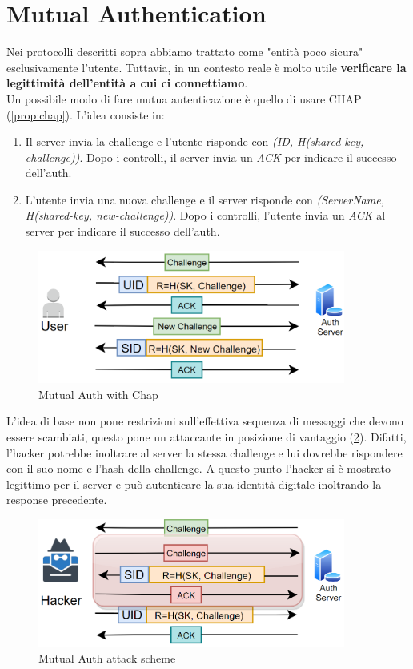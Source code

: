 \section{Mutual Authentication}\label{chap:mutualauth}
Nei protocolli descritti sopra abbiamo trattato come "entità poco sicura" esclusivamente l'utente. Tuttavia, in un contesto reale è molto utile \textbf{verificare la legittimità dell'entità a cui ci connettiamo}.\\
Un possibile modo di fare mutua autenticazione è quello di usare CHAP (\cref{prop:chap}). L'idea consiste in:
\begin{enumerate}
    \item Il server invia la challenge e l'utente risponde con \textit{(ID, H(shared-key, challenge))}. Dopo i controlli, il server invia un \textit{ACK} per indicare il successo dell'auth.
    \item L'utente invia una nuova challenge e il server risponde con \textit{(ServerName, H(shared-key, new-challenge))}. Dopo i controlli, l'utente invia un \textit{ACK} al server per indicare il successo dell'auth.
\end{enumerate}
\begin{figure}[h]
    \centering
    \includegraphics[width=0.9\textwidth]{image/chapmutual.png}
    \caption{Mutual Auth with Chap}
    \label{fig:chapmutual}
\end{figure}
\begin{remark}
L'idea di base non pone restrizioni sull'effettiva sequenza di messaggi che devono essere scambiati, questo pone un attaccante in posizione di vantaggio (\cref{fig:chapmutualatk}). Difatti, l'hacker potrebbe inoltrare al server la stessa challenge e lui dovrebbe rispondere con il suo nome e l'hash della challenge. A questo punto l'hacker si è mostrato legittimo per il server e può autenticare la sua identità digitale inoltrando la response precedente. 
\end{remark}
\begin{figure}[ht]
    \centering
    \includegraphics[width=0.9\textwidth]{image/chapmutualatk.png}
    \caption{Mutual Auth attack scheme}
    \label{fig:chapmutualatk}
\end{figure}

